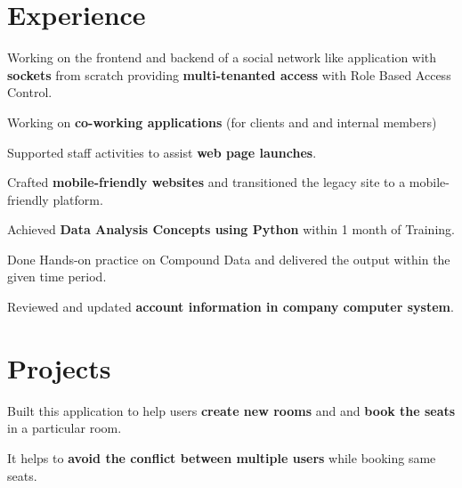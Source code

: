 \documentclass[]{deedy-resume-openfont}
\begin{document}
\hfill
\begin{minipage}[t]{0.66\textwidth} 


\section{Experience}

\vspace{\topsep} %
\begin{tightemize}
\item Working on the frontend and backend of a social network like application with \textbf{sockets} from scratch providing \textbf{multi-tenanted access} with Role Based Access Control.
\item Working on \textbf{co-working applications} (for clients and and internal members)
\end{tightemize}

\sectionsep

\begin{tightemize}
\item Supported staff activities to assist \textbf{web page launches}.
\item Crafted \textbf{mobile-friendly websites} and transitioned the legacy site to a mobile-friendly platform.
\end{tightemize}

\begin{tightemize}
\item Achieved \textbf{Data Analysis Concepts using Python} within 1 month of Training.
\item Done Hands-on practice on Compound Data and delivered the output within the given time period.
\item Reviewed and updated \textbf{account information in company computer system}.
\end{tightemize}
\sectionsep



\section{Projects}
{\href{https://github.com/Niharika100/Niharika100-bookRoom_backend}{\bf{}}}
\begin{tightemize}
\item Built this application to help users \textbf{create new rooms} and and \textbf{book the seats} in a particular room.
\item It helps to \textbf{avoid the conflict between multiple users} while booking same seats.
\end{tightemize}


\end{minipage}
\end{document}
